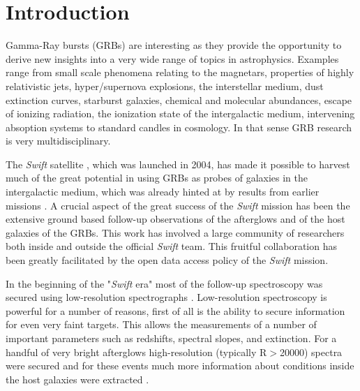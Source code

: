 \documentclass{aa}    %
\begin{document}
\section{Introduction}

Gamma-Ray bursts (GRBs) are interesting as they provide the opportunity to
derive new insights into a very wide range of topics in astrophysics. Examples
range from small scale phenomena relating to the magnetars, properties of highly
relativistic jets, hyper/supernova explosions, the interstellar medium, dust extinction
curves, starburst galaxies, chemical and molecular abundances, escape of ionizing 
radiation, the ionization state of the intergalactic medium, intervening
absoption systems to standard candles in cosmology.  In that sense GRB research
is very multidisciplinary. 

The {\it Swift} satellite \citep{Gehrels2009}, which was launched in 2004, has
made it possible to harvest much of the great potential in using GRBs as probes
of galaxies in the intergalactic medium, which was already hinted at by results
from earlier missions \citep[e.g.][]{Ricker2004}.  A crucial aspect of the great
success of the {\it Swift} mission has been the extensive ground based
follow-up observations of the afterglows and of the host galaxies of the GRBs.
This work has involved a large community of researchers both inside and outside
the official {\it Swift} team. This fruitful collaboration has been greatly
facilitated by the open data access policy of the {\it Swift} mission.

In the beginning of the "{\it Swift} era" most of the follow-up spectroscopy
was secured using low-resolution spectrographs 
\citep[typically
R=$\lambda/\Delta\lambda$$<$1000, e.g.][]{Fynbo2009}. Low-resolution
spectroscopy is powerful for a number of reasons, first of all is the ability
to secure information for even very faint targets. This allows the measurements
of a number of important parameters such as redshifts, spectral slopes,
and extinction. For
a handful of very bright afterglows high-resolution (typically R$>$20000)
spectra were secured and for these events much more information about
conditions inside the host galaxies were extracted 
\citep[e.g.,][]{Fiore2005, Thone2007, Prochaska2007, Vreeswijk2007, Castro-Tirado2010}. 
\end{document}
